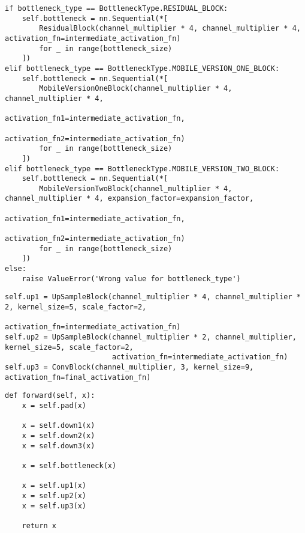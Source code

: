 \begin{listing}[H]
\begin{verbatim}
if bottleneck_type == BottleneckType.RESIDUAL_BLOCK:
    self.bottleneck = nn.Sequential(*[
        ResidualBlock(channel_multiplier * 4, channel_multiplier * 4, activation_fn=intermediate_activation_fn)
        for _ in range(bottleneck_size)
    ])
elif bottleneck_type == BottleneckType.MOBILE_VERSION_ONE_BLOCK:
    self.bottleneck = nn.Sequential(*[
        MobileVersionOneBlock(channel_multiplier * 4, channel_multiplier * 4,
                              activation_fn1=intermediate_activation_fn,
                              activation_fn2=intermediate_activation_fn)
        for _ in range(bottleneck_size)
    ])
elif bottleneck_type == BottleneckType.MOBILE_VERSION_TWO_BLOCK:
    self.bottleneck = nn.Sequential(*[
        MobileVersionTwoBlock(channel_multiplier * 4, channel_multiplier * 4, expansion_factor=expansion_factor,
                              activation_fn1=intermediate_activation_fn,
                              activation_fn2=intermediate_activation_fn)
        for _ in range(bottleneck_size)
    ])
else:
    raise ValueError('Wrong value for bottleneck_type')
\end{verbatim}
\label{lst:transformer_net_full_2}
\end{listing}

\begin{listing}[H]
\begin{verbatim}
self.up1 = UpSampleBlock(channel_multiplier * 4, channel_multiplier * 2, kernel_size=5, scale_factor=2,
                                 activation_fn=intermediate_activation_fn)
self.up2 = UpSampleBlock(channel_multiplier * 2, channel_multiplier, kernel_size=5, scale_factor=2,
                         activation_fn=intermediate_activation_fn)
self.up3 = ConvBlock(channel_multiplier, 3, kernel_size=9, activation_fn=final_activation_fn)
\end{verbatim}
\label{lst:transformer_net_full_3}
\end{listing}

\pagebreak

\begin{listing}[H]
\begin{verbatim}
def forward(self, x):
    x = self.pad(x)

    x = self.down1(x)
    x = self.down2(x)
    x = self.down3(x)

    x = self.bottleneck(x)

    x = self.up1(x)
    x = self.up2(x)
    x = self.up3(x)

    return x
\end{verbatim}
\label{lst:transformer_net_full_4}
\end{listing}
